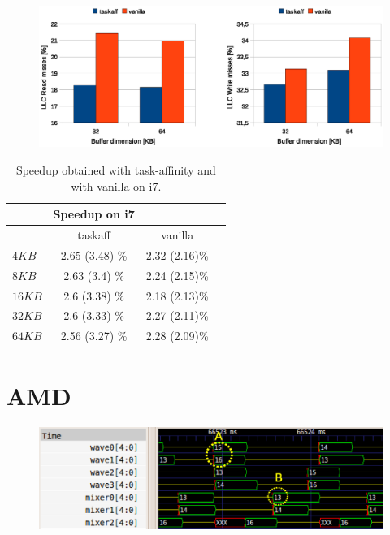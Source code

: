 \begin{figure}[htbp]
\centering
\includegraphics[width=\widefigure]{images/results_i7/l3_load_store_i7.eps}
\caption{}
\label{fig:l2_load_store_i7}
\end{figure}

\begin{table}[htbp]
\begin{center}
\begin{tabular}{l|c|c|c}
	\hline
	& Speedup on i7 \\ \hline
	& taskaff & vanilla \\ \hline
	$4KB$  & 2.65 (3.48) \% & 2.32 (2.16)\% \\ \hline
	$8KB$  & 2.63 (3.4) \% & 2.24 (2.15)\% \\ \hline
	$16KB$ & 2.6 (3.38) \% & 2.18 (2.13)\% \\ \hline
	$32KB$ & 2.6 (3.33) \% & 2.27 (2.11)\% \\ \hline
	$64KB$ & 2.56 (3.27) \% & 2.28 (2.09)\% \\ \hline
\end{tabular}
\caption{Speedup obtained with task-affinity and with vanilla on i7.}
\label{tab:speedup_i7}
\end{center}
\end{table}

\newpage
\section{AMD}

\begin{figure}[htbp]
\centering
\includegraphics[width=\widefigure]{images/results_AMD/final_AMD.eps}
\caption{}
\label{fig:trace_AMD}
\end{figure}

